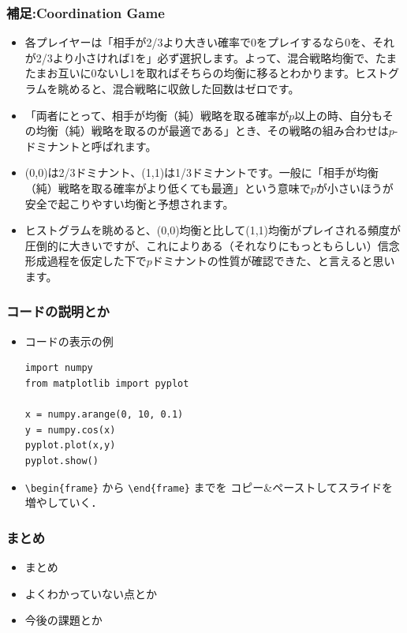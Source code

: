 \documentclass[dvipdfmx,fleqn]{beamer}
\begin{document}
\begin{frame}
\frametitle{補足:Coordination Game}
\begin{itemize}\setlength{\parskip}{0.5em}
\item
各プレイヤーは「相手が2/3より大きい確率で0をプレイするなら0を、それが2/3より小さければ1を」必ず選択します。よって、混合戦略均衡で、たまたまお互いに0ないし1を取ればそちらの均衡に移るとわかります。ヒストグラムを眺めると、混合戦略に収斂した回数はゼロです。 \pause
\item
「両者にとって、相手が均衡（純）戦略を取る確率が$p$以上の時、自分もその均衡（純）戦略を取るのが最適である」とき、その戦略の組み合わせは$p$-ドミナントと呼ばれます。\pause
\item
(0,0)は2/3ドミナント、(1,1)は1/3ドミナントです。一般に「相手が均衡（純）戦略を取る確率がより低くても最適」という意味で$p$が小さいほうが安全で起こりやすい均衡と予想されます。\pause
\item
ヒストグラムを眺めると、(0,0)均衡と比して(1,1)均衡がプレイされる頻度が圧倒的に大きいですが、これによりある（それなりにもっともらしい）信念形成過程を仮定した下で$p$ドミナントの性質が確認できた、と言えると思います。

\end{itemize}
\end{frame}




\begin{frame}[containsverbatim]%
\frametitle{コードの説明とか}
\begin{itemize}\setlength{\parskip}{0.5em}
\item
コードの表示の例
\begin{verbatim}
import numpy
from matplotlib import pyplot

x = numpy.arange(0, 10, 0.1)
y = numpy.cos(x)
pyplot.plot(x,y)
pyplot.show()
\end{verbatim}

\item
\verb|\begin{frame}| から \verb|\end{frame}| までを
コピー\&ペーストしてスライドを増やしていく．
\end{itemize}
\end{frame}



\begin{frame}
\frametitle{まとめ}
\begin{itemize}\setlength{\parskip}{0.5em}
\item
まとめ

\item
よくわかっていない点とか

\item
今後の課題とか
\end{itemize}
\end{frame}
\end{document}
